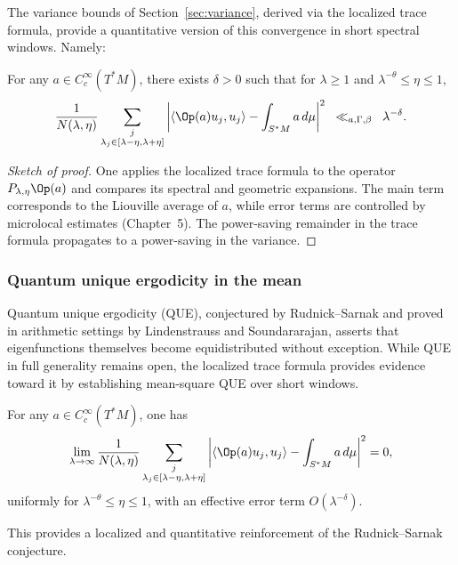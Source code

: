 The variance bounds of Section~\ref{sec:variance}, derived via the localized trace formula, provide a quantitative version of this convergence in short spectral windows. Namely:

\begin{theorem}\label{thm:qe}
For any $a \in C_c^\infty(T^*M)$, there exists $\delta > 0$ such that for $\lambda \geq 1$ and $\lambda^{-\theta} \leq \eta \leq 1$,
\[
\frac{1}{N(\lambda,\eta)} \sum_{\substack{j \\ \lambda_j \in [\lambda-\eta,\lambda+\eta]}} 
\left| \langle \Op(a) u_j, u_j \rangle - \int_{S^*M} a \, d\mu \right|^2
\;\;\ll_{a,\Gamma,\beta}\;\; \lambda^{-\delta}.
\]
\end{theorem}

\begin{proof}[Sketch of proof]
One applies the localized trace formula to the operator $P_{\lambda,\eta} \Op(a)$ and compares its spectral and geometric expansions. The main term corresponds to the Liouville average of $a$, while error terms are controlled by microlocal estimates (Chapter~5). The power-saving remainder in the trace formula propagates to a power-saving in the variance.
\end{proof}

\subsubsection{Quantum unique ergodicity in the mean}

Quantum unique ergodicity (QUE), conjectured by Rudnick–Sarnak and proved in arithmetic settings by Lindenstrauss and Soundararajan, asserts that eigenfunctions themselves become equidistributed without exception. While QUE in full generality remains open, the localized trace formula provides evidence toward it by establishing mean-square QUE over short windows.

\begin{corollary}\label{cor:que}
For any $a \in C_c^\infty(T^*M)$, one has
\[
\lim_{\lambda \to \infty} \frac{1}{N(\lambda,\eta)} \sum_{\substack{j \\ \lambda_j \in [\lambda-\eta,\lambda+\eta]}} 
\left| \langle \Op(a) u_j, u_j \rangle - \int_{S^*M} a \, d\mu \right|^2 = 0,
\]
uniformly for $\lambda^{-\theta} \leq \eta \leq 1$, with an effective error term $O(\lambda^{-\delta})$.
\end{corollary}

This provides a localized and quantitative reinforcement of the Rudnick–Sarnak conjecture.

